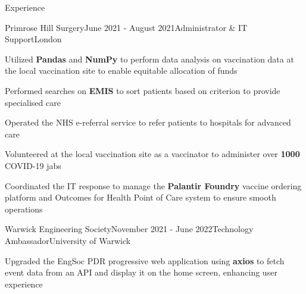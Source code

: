 \documentclass{resume}
\begin{document}
\begin{rSection}{Experience}
        \begin{rSubsection}{Primrose Hill Surgery}{June 2021 - August 2021}{Administrator \& IT Support}{London}{}
            \item Utilized \textbf{Pandas} and \textbf{NumPy} to perform data analysis on vaccination data at the local vaccination site to enable equitable allocation of funds
            \item Performed searches on \textbf{EMIS} to sort patients based on criterion to provide specialised care
            \item Operated the NHS e-referral service to refer patients to hospitals for advanced care
            \item Volunteered at the local vaccination site as a vaccinator to administer over \textbf{1000} COVID-19 jabs
            \item Coordinated the IT response to manage the \textbf{Palantir Foundry} vaccine ordering platform and Outcomes for Health Point of Care system to ensure smooth operations
        \end{rSubsection}

        \begin{rSubsection}{Warwick Engineering Society}{November 2021 - June 2022}{Technology Ambassador}{University of Warwick}{}
            \item Upgraded the EngSoc PDR progressive web application using {\bf axios} to fetch event data from an API and display it on the home screen, enhancing user experience
        \end{rSubsection}
    \end{rSection}
\end{document}
